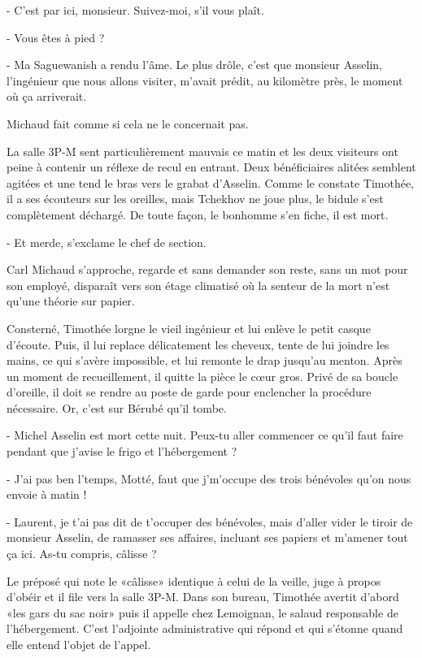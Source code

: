 - C’est par ici, monsieur. Suivez-moi, s’il vous plaît.

- Vous êtes à pied ?

- Ma Saguewanish a rendu l’âme. Le plus drôle, c’est que monsieur Asselin, l’ingénieur que nous allons visiter, m’avait prédit, au kilomètre près, le moment où ça arriverait.

Michaud fait comme si cela ne le concernait pas.

La salle 3P-M sent particulièrement mauvais ce matin et les deux visiteurs ont peine à contenir un réflexe de recul en entrant. Deux bénéficiaires alitées semblent agitées et une tend le bras vers le grabat d’Asselin. Comme le constate Timothée, il a ses écouteurs sur les oreilles, mais Tchekhov ne joue plus, le bidule s’est complètement déchargé. De toute façon, le bonhomme s’en fiche, il est mort.

- Et merde, s’exclame le chef de section.

Carl Michaud s’approche, regarde et sans demander son reste, sans un mot pour son employé, disparaît vers son étage climatisé où la senteur de la mort n’est qu’une théorie sur papier.

Consterné, Timothée lorgne le vieil ingénieur et lui enlève le petit casque d’écoute. Puis, il lui replace délicatement les cheveux, tente de lui joindre les mains, ce qui s’avère impossible, et lui remonte le drap jusqu’au menton. Après un moment de recueillement, il quitte la pièce le cœur gros. Privé de sa boucle d’oreille, il doit se rendre au poste de garde pour enclencher la procédure nécessaire. Or, c’est sur Bérubé qu’il tombe.

- Michel Asselin est mort cette nuit. Peux-tu aller commencer ce qu’il faut faire pendant que j’avise le frigo et l’hébergement ?

- J’ai pas ben l’temps, Motté, faut que j’m’occupe des trois bénévoles qu’on nous envoie à matin !

- Laurent, je t’ai pas dit de t’occuper des bénévoles, mais d’aller vider le tiroir de monsieur Asselin, de ramasser ses affaires, incluant ses papiers et m’amener tout ça ici. As-tu compris, câlisse ?

Le préposé qui note le «câlisse» identique à celui de la veille, juge à propos d’obéir et il file vers la salle 3P-M. Dans son bureau, Timothée avertit d’abord «les gars du sac noir» puis il appelle chez Lemoignan, le salaud responsable de l’hébergement. C’est l’adjointe administrative qui répond et qui s’étonne quand elle entend l’objet de l’appel.

